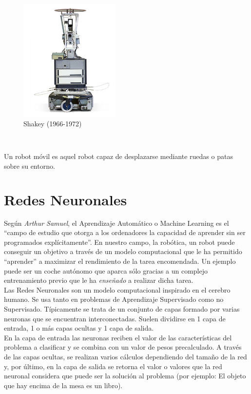\begin{figure} [h!]
  \begin{center}
    \includegraphics[width=5cm]{imagenes/shakey.jpg}
  \end{center}
  \caption{Shakey (1966-1972) \cite{shakey-the-robot}}
  \label{fig:shakey}
\end{figure}\

Un robot móvil es aquel robot capaz de desplazarse mediante ruedas o patas sobre su entorno.

\section{Redes Neuronales}
\label{sec:redes_neuronales}

Según \emph{Arthur Samuel}, el Aprendizaje Automático o Machine Learning es el ``campo de estudio que otorga a los ordenadores la capacidad de aprender sin ser programados explícitamente''. En nuestro campo, la robótica, un robot puede conseguir un objetivo a través de un modelo computacional que le ha permitido ``aprender'' a maximizar el rendimiento de la tarea encomendada. Un ejemplo puede ser un coche autónomo que aparca sólo gracias a un complejo entrenamiento previo que le ha \emph{enseñado} a realizar dicha tarea.\\

Las Redes Neuronales son un modelo computacional inspirado en el cerebro humano. Se usa tanto en problemas de Aprendizaje Supervisado como no Supervisado. Típicamente se trata de un conjunto de capas formado por varias neuronas que se encuentran interconectadas. Suelen dividirse en 1 capa de entrada, 1 o más capas ocultas y 1 capa de salida.\\

En la capa de entrada las neuronas reciben el valor de las características del problema a clasificar y se combina con un valor de pesos precalculado. A través de las capas ocultas, se realizan varios cálculos dependiendo del tamaño de la red y, por último, en la capa de salida se retorna el valor o valores que la red neuronal considera que puede ser la solución al problema (por ejemplo: El objeto que hay encima de la mesa es un libro).\\

